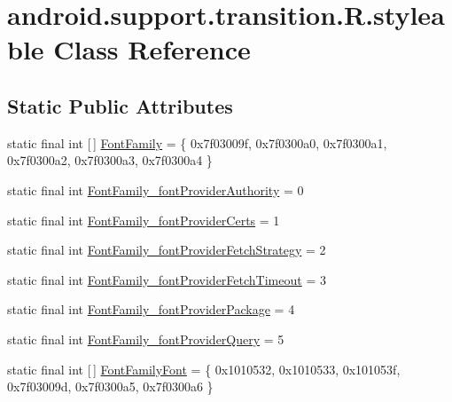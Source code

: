 \hypertarget{classandroid_1_1support_1_1transition_1_1_r_1_1styleable}{}\section{android.\+support.\+transition.\+R.\+styleable Class Reference}
\label{classandroid_1_1support_1_1transition_1_1_r_1_1styleable}
\subsection*{Static Public Attributes}
\begin{DoxyCompactItemize}
\item 
static final int \mbox{[}$\,$\mbox{]} \mbox{\hyperlink{classandroid_1_1support_1_1transition_1_1_r_1_1styleable_a7597f7b203cd6552f52ff451ef67a101}{Font\+Family}} = \{ 0x7f03009f, 0x7f0300a0, 0x7f0300a1, 0x7f0300a2, 0x7f0300a3, 0x7f0300a4 \}
\item 
static final int \mbox{\hyperlink{classandroid_1_1support_1_1transition_1_1_r_1_1styleable_a5e4a75ec004885a8e02fd6765a7f2fb7}{Font\+Family\+\_\+font\+Provider\+Authority}} = 0
\item 
static final int \mbox{\hyperlink{classandroid_1_1support_1_1transition_1_1_r_1_1styleable_a9570caeee4d31463c78df12b78492675}{Font\+Family\+\_\+font\+Provider\+Certs}} = 1
\item 
static final int \mbox{\hyperlink{classandroid_1_1support_1_1transition_1_1_r_1_1styleable_a333c92f109c007831f8d61fe1c177259}{Font\+Family\+\_\+font\+Provider\+Fetch\+Strategy}} = 2
\item 
static final int \mbox{\hyperlink{classandroid_1_1support_1_1transition_1_1_r_1_1styleable_a86713b50c4e5780f60ed2258828432b8}{Font\+Family\+\_\+font\+Provider\+Fetch\+Timeout}} = 3
\item 
static final int \mbox{\hyperlink{classandroid_1_1support_1_1transition_1_1_r_1_1styleable_a9125e7a61176bb0e99dfb26a0fbba310}{Font\+Family\+\_\+font\+Provider\+Package}} = 4
\item 
static final int \mbox{\hyperlink{classandroid_1_1support_1_1transition_1_1_r_1_1styleable_aa028215ae3a5d346664e17c1b9f65fac}{Font\+Family\+\_\+font\+Provider\+Query}} = 5
\item 
static final int \mbox{[}$\,$\mbox{]} \mbox{\hyperlink{classandroid_1_1support_1_1transition_1_1_r_1_1styleable_aba5d65f84f0a65416b5f84ffdf9198ea}{Font\+Family\+Font}} = \{ 0x1010532, 0x1010533, 0x101053f, 0x7f03009d, 0x7f0300a5, 0x7f0300a6 \}

\end{DoxyCompactItemize}
